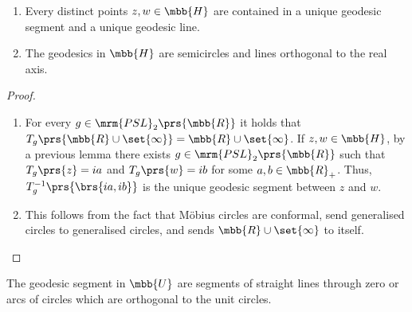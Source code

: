 \documentclass[10pt, twoside]{book}
\begin{document}
\begin{theorem}

\begin{enumerate}
\item
Every distinct points $z,w \in \mbb{H}$ are contained in a unique geodesic segment and a unique geodesic line.

\item The geodesics in $\mbb{H}$ are semicircles and lines orthogonal to the real axis.
\end{enumerate}
\end{theorem}

\begin{proof}
\begin{enumerate}
\item
For every $g \in \mrm{PSL}_2\prs{\mbb{R}}$ it holds that $T_g\prs{\mbb{R} \cup \set{\infty}} = \mbb{R} \cup \set{\infty}$. If $z,w \in \mbb{H}$, by a previous lemma there exists $g \in \mrm{PSL}_2\prs{\mbb{R}}$ such that $T_g\prs{z} = ia$ and $T_g\prs{w} = ib$ for some $a,b \in \mbb{R}_+$.
Thus, $T_g^{-1} \prs{\brs{ia, ib}}$ is the unique geodesic segment between $z$ and $w$.

\item This follows from the fact that Möbius circles are conformal, send generalised circles to generalised circles, and sends $\mbb{R} \cup \set{\infty}$ to itself.      
\end{enumerate}
\end{proof}

\begin{corollary}
The geodesic segment in $\mbb{U}$ are segments of straight lines through zero or arcs of circles which are orthogonal to the unit circles.
\end{corollary}
\end{document}
